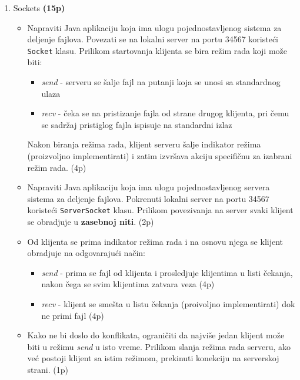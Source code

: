 \documentclass[]{article}
\begin{document}
\begin{enumerate}
  \item Sockets \textbf{(15p)}
  \begin{itemize}
    \item Napraviti Java aplikaciju koja ima ulogu pojednostavljenog sistema za deljenje fajlova. Povezati se na lokalni server na portu 34567 koriste\'c{}i \texttt{Socket} klasu. Prilikom startovanja klijenta se bira re\v{z}im rada koji mo\v{z}e biti:
    \begin{itemize}
      \item \emph{send} - serveru se \v{s}alje fajl na putanji koja se unosi sa standardnog ulaza
      \item \emph{recv} - \v{c}eka se na pristizanje fajla od strane drugog klijenta, pri \v{c}emu se sadr\v{z}aj pristiglog fajla ispisuje na standardni izlaz
    \end{itemize} 
    Nakon biranja re\v{z}ima rada, klijent serveru \v{s}alje indikator re\v{z}ima (proizvoljno implementirati) i zatim izvr\v{s}ava akciju specifi\v{c}nu za izabrani re\v{z}im rada. \hfill (4p)
    \item Napraviti Java aplikaciju koja ima ulogu pojednostavljenog servera sistema za deljenje fajlova. Pokrenuti lokalni server na portu 34567 koriste\'c{}i \texttt{ServerSocket} klasu. Prilikom povezivanja na server svaki klijent se obradjuje u \textbf{zasebnoj niti}. \hfill (2p)
    \item Od klijenta se prima indikator re\v{z}ima rada i na osnovu njega se klijent obradjuje na odgovaraju\'c{}i na\v{c}in:
    \begin{itemize} 
      \item \emph{send} - prima se fajl od klijenta i prosledjuje klijentima u listi \v{c}ekanja, nakon \v{c}ega se svim klijentima zatvara veza \hfill (4p)
      \item \emph{recv} - klijent se sme\v{s}ta u listu \v{c}ekanja (proivoljno implementirati) dok ne primi fajl \hfill (4p)
    \end{itemize}
    \item Kako ne bi doslo do konflikata, ograni\v{c}iti da najvi\v{s}e jedan klijent mo\v{z}e biti u re\v{z}imu \emph{send} u isto vreme. Prilikom slanja re\v{z}ima rada serveru, ako ve\'c{} postoji klijent sa istim re\v{z}imom, prekinuti konekciju na serverskoj strani. \hfill (1p)
  \end{itemize}


\end{enumerate}
\end{document}
